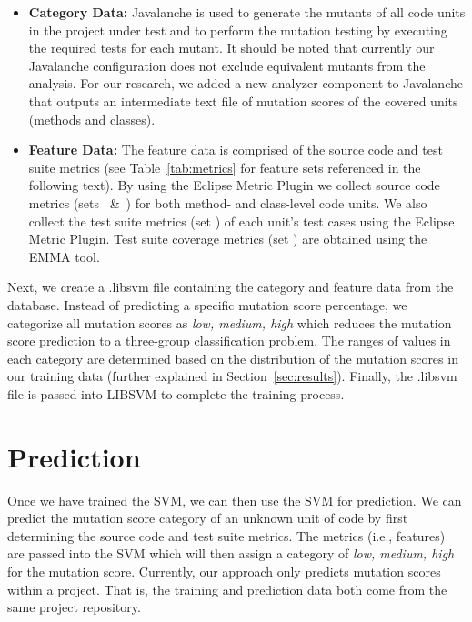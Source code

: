 \begin{itemize}
  \item \textbf{Category Data:} Javalanche is used to generate the mutants of all code units in the project under test and to perform the mutation testing by executing the required tests for each mutant. It should be noted that currently our Javalanche configuration does not exclude equivalent mutants from the analysis. For our research, we added a new analyzer component to Javalanche that outputs an intermediate text file of mutation scores of the covered units (methods and classes).

  \item \textbf{Feature Data:} The feature data is comprised of the source code and test suite metrics (see Table~\ref{tab:metrics} for feature sets referenced in the following text). By using the Eclipse Metric Plugin we collect source code metrics (sets ~\&~) for both method- and class-level code units. We also collect the test suite metrics (set ) of each unit's test cases using the Eclipse Metric Plugin. Test suite coverage metrics (set ) are obtained using the EMMA tool.
\end{itemize}

Next, we create a .libsvm file containing the category and feature data from the database. Instead of predicting a specific mutation score percentage, we categorize all mutation scores as \textit{low, medium, high} which reduces the mutation score prediction to a three-group classification problem. The ranges of values in each category are determined based on the distribution of the mutation scores in our training data (further explained in Section~\ref{sec:results}). Finally, the .libsvm file is passed into LIBSVM to complete the training process.


\section{Prediction}
\label{sec:prediction}
Once we have trained the SVM, we can then use the SVM for prediction. We can predict the mutation score category of an unknown unit of code by first determining the source code and test suite metrics. The metrics (i.e., features) are passed into the SVM which will then assign a category of \textit{low, medium, high} for the mutation score.  Currently, our approach only predicts mutation scores within a project. That is, the training and prediction data both come from the same project repository.
